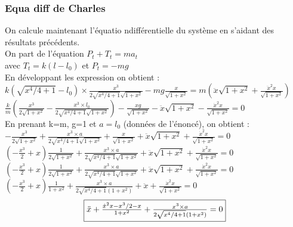 \documentclass[10pt,a4paper]{article}
\begin{document}
\subsubsection{Equa diff de Charles}
On calcule maintenant l'équatio ndifférentielle du système en s'aidant des résultats précédents.\\
On part de l'équation $ P_t+T_t=ma_t $\\
avec $T_t=k(l-l_0)$ et $P_t=-mg$\\
En développant les expression on obtient :\\
$k(\sqrt{x^4/4+1}-l_0)\times \frac{x^3}{2\sqrt{x^4/4+1}\sqrt{1+x^2}}-mg\frac{x}{\sqrt{1+x^2}}=m(\ddot{x}\sqrt{1+x^2}+\frac{\ddot{x}^2x}{\sqrt{1+x^2}})$\\
$ \frac{k}{m}(\frac{x^3}{2\sqrt{1+x^2}}-\frac{x^3\times l_0}{2\sqrt{x^4/4+1}\sqrt{1+x^2}})-\frac{xg}{\sqrt{1+x^2}}-\ddot{x}\sqrt{1+x^2}-\frac{\dot{x}^2x}{\sqrt{1+x^2}}=0 $\\
En prenant k=m, g=1 et $a=l_0$ (données de l'énoncé), on obtient :\\
$ -\frac{x^3}{2\sqrt{1+x^2}}+\frac{x^3\times a}{2\sqrt{x^4/4+1}\sqrt{1+x^2}}+\frac{x}{\sqrt{1+x^2}}+\ddot{x}\sqrt{1+x^2}+\frac{\dot{x}^2x}{\sqrt{1+x^2}}=0 $\\
$ (-\frac{x^3}{2}+x)\frac{1}{2\sqrt{1+x^2}}+\frac{x^3\times a}{2\sqrt{x^4/4+1}\sqrt{1+x^2}}+\ddot{x}\sqrt{1+x^2}+\frac{\dot{x}^2x}{\sqrt{1+x^2}}=0 $\\
$ (-\frac{x^3}{2}+x)\frac{1}{2\sqrt{1+x^2}}+\frac{x^3\times a}{2\sqrt{x^4/4+1}\sqrt{1+x^2}}+\ddot{x}\sqrt{1+x^2}+\frac{\dot{x}^2x}{\sqrt{1+x^2}}=0 $\\
$ (-\frac{x^3}{2}+x)\frac{1}{1+x^2}+\frac{x^3\times a}{2\sqrt{x^4/4+1}(1+x^2)}+\ddot{x}+\frac{\dot{x}^2x}{\sqrt{1+x^2}}=0 $\\
\[ \fbox{$ \ddot{x}+\frac{\dot{x}^2x-x^3/2-x}{1+x^2}+\frac{x^3\times a}{2\sqrt{x^4/4+1}(1+x^2)}=0 $}\]
\end{document}
